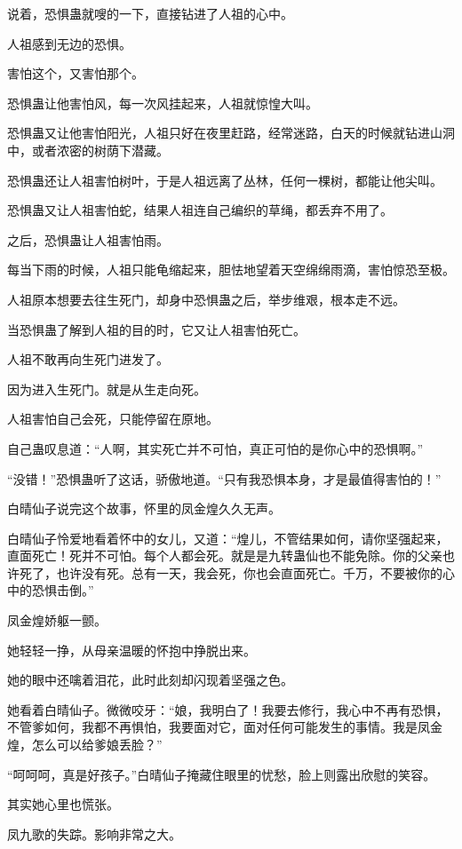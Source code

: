 \begin{this_body}
说着，恐惧蛊就嗖的一下，直接钻进了人祖的心中。

人祖感到无边的恐惧。

害怕这个，又害怕那个。

恐惧蛊让他害怕风，每一次风挂起来，人祖就惊惶大叫。

恐惧蛊又让他害怕阳光，人祖只好在夜里赶路，经常迷路，白天的时候就钻进山洞中，或者浓密的树荫下潜藏。

恐惧蛊还让人祖害怕树叶，于是人祖远离了丛林，任何一棵树，都能让他尖叫。

恐惧蛊又让人祖害怕蛇，结果人祖连自己编织的草绳，都丢弃不用了。

之后，恐惧蛊让人祖害怕雨。

每当下雨的时候，人祖只能龟缩起来，胆怯地望着天空绵绵雨滴，害怕惊恐至极。

人祖原本想要去往生死门，却身中恐惧蛊之后，举步维艰，根本走不远。

当恐惧蛊了解到人祖的目的时，它又让人祖害怕死亡。

人祖不敢再向生死门进发了。

因为进入生死门。就是从生走向死。

人祖害怕自己会死，只能停留在原地。

自己蛊叹息道：“人啊，其实死亡并不可怕，真正可怕的是你心中的恐惧啊。”

“没错！”恐惧蛊听了这话，骄傲地道。“只有我恐惧本身，才是最值得害怕的！”

白晴仙子说完这个故事，怀里的凤金煌久久无声。

白晴仙子怜爱地看着怀中的女儿，又道：“煌儿，不管结果如何，请你坚强起来，直面死亡！死并不可怕。每个人都会死。就是是九转蛊仙也不能免除。你的父亲也许死了，也许没有死。总有一天，我会死，你也会直面死亡。千万，不要被你的心中的恐惧击倒。”

凤金煌娇躯一颤。

她轻轻一挣，从母亲温暖的怀抱中挣脱出来。

她的眼中还噙着泪花，此时此刻却闪现着坚强之色。

她看着白晴仙子。微微咬牙：“娘，我明白了！我要去修行，我心中不再有恐惧，不管爹如何，我都不再惧怕，我要面对它，面对任何可能发生的事情。我是凤金煌，怎么可以给爹娘丢脸？”

“呵呵呵，真是好孩子。”白晴仙子掩藏住眼里的忧愁，脸上则露出欣慰的笑容。

其实她心里也慌张。

凤九歌的失踪。影响非常之大。


\end{this_body}
